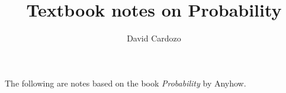 \documentclass[notitlepage]{report}
\author{David Cardozo}
\title{Textbook notes on Probability}
\begin{document}
\maketitle
The following are notes based on the book \textit{Probability} by Anyhow.
\end{document}
